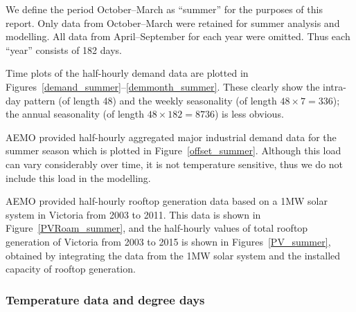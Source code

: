 \documentclass[11pt]{article}
\begin{document}
We define the period October--March as ``summer'' for the purposes of this report. Only data from October--March were retained for summer analysis and modelling. All data from April--September for each year were omitted. Thus each ``year'' consists of 182 days.

Time plots of the half-hourly demand data are plotted in Figures~\ref{demand_summer}--\ref{demmonth_summer}. These clearly show the intra-day pattern (of length 48) and the weekly seasonality (of length $48\times7 = 336$); the annual seasonality (of length $48\times182=8736$) is less obvious.

AEMO provided half-hourly aggregated major industrial demand data for the summer season which is plotted in Figure~\ref{offset_summer}. Although this load can vary considerably over time, it is not temperature sensitive, thus we do not include this load in the modelling.




AEMO provided half-hourly rooftop generation data based on a 1MW solar system in Victoria from 2003 to 2011. This data is shown in Figure~\ref{PVRoam_summer}, and the half-hourly values of total rooftop generation of Victoria from 2003 to 2015 is shown in Figures~\ref{PV_summer}, obtained by integrating the data from the 1MW solar system and the installed capacity of rooftop generation. 




\subsubsection{Temperature data and degree days}
\end{document}
